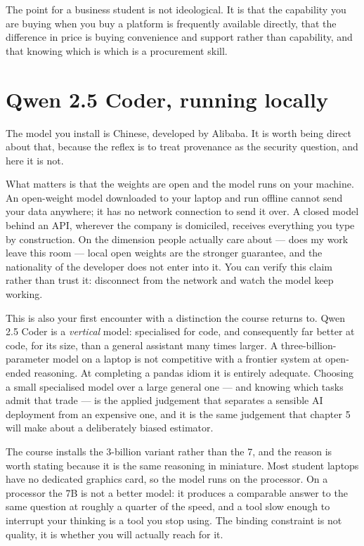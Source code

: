 \documentclass[
  letterpaper,
  10pt,
  twoside,
  openright,
  numbers=noenddot,
  chapterprefix=true]{scrbook}
\begin{document}
The point for a business student is not ideological. It is that the
capability you are buying when you buy a platform is frequently
available directly, that the difference in price is buying convenience
and support rather than capability, and that knowing which is which is a
procurement skill.

\section{Qwen 2.5 Coder, running
locally}\label{qwen-2.5-coder-running-locally}

The model you install is Chinese, developed by Alibaba. It is worth
being direct about that, because the reflex is to treat provenance as
the security question, and here it is not.

What matters is that the weights are open and the model runs on your
machine. An open-weight model downloaded to your laptop and run offline
cannot send your data anywhere; it has no network connection to send it
over. A closed model behind an API, wherever the company is domiciled,
receives everything you type by construction. On the dimension people
actually care about --- does my work leave this room --- local open
weights are the stronger guarantee, and the nationality of the developer
does not enter into it. You can verify this claim rather than trust it:
disconnect from the network and watch the model keep working.

This is also your first encounter with a distinction the course returns
to. Qwen 2.5 Coder is a \emph{vertical} model: specialised for code, and
consequently far better at code, for its size, than a general assistant
many times larger. A three-billion-parameter model on a laptop is not
competitive with a frontier system at open-ended reasoning. At
completing a pandas idiom it is entirely adequate. Choosing a small
specialised model over a large general one --- and knowing which tasks
admit that trade --- is the applied judgement that separates a sensible
AI deployment from an expensive one, and it is the same judgement that
chapter 5 will make about a deliberately biased estimator.

The course installs the 3-billion variant rather than the 7, and the
reason is worth stating because it is the same reasoning in miniature.
Most student laptops have no dedicated graphics card, so the model runs
on the processor. On a processor the 7B is not a better model: it
produces a comparable answer to the same question at roughly a quarter
of the speed, and a tool slow enough to interrupt your thinking is a
tool you stop using. The binding constraint is not quality, it is
whether you will actually reach for it.
\end{document}
